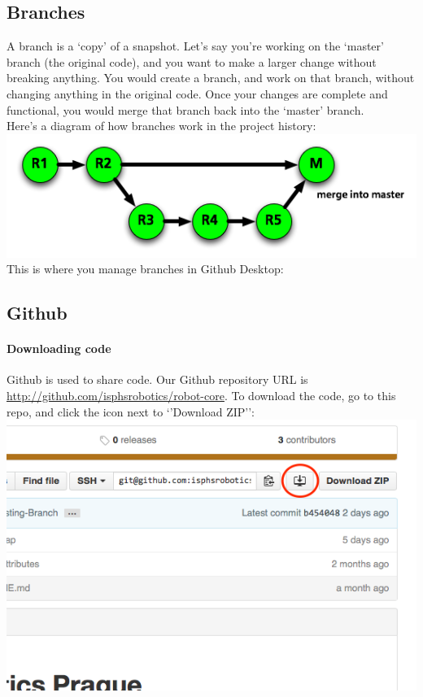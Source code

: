 \documentclass[12p,a4paper]{article}
\begin{document}
\subsection{Branches}
A branch is a `copy' of a snapshot. Let's say you're working on the `master' branch (the original code), and you want to make a larger change without breaking anything. You would create a branch, and work on that branch, without changing anything in the original code. Once your changes are complete and functional, you would merge that branch back into the `master' branch.\\
Here's a diagram of how branches work in the project history:\\
\includegraphics[scale=0.6]{git-branches}\\
This is where you manage branches in Github Desktop:

\subsection{Github}
\paragraph{Downloading code}Github is used to share code. Our Github repository URL is \url{http://github.com/isphsrobotics/robot-core}. To download the code, go to this repo, and click the icon next to `'Download ZIP'':\\
\includegraphics[scale=0.6]{download-repo}
\end{document}
